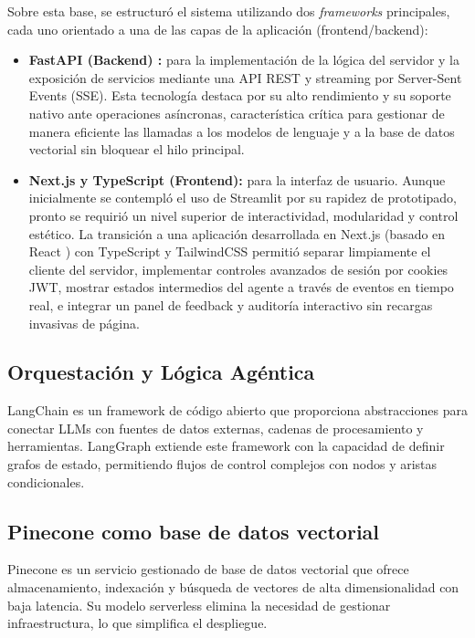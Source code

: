 \documentclass[12pt,a4paper,oneside]{report}
\begin{document}
Sobre esta base, se estructuró el sistema utilizando dos \textit{frameworks} principales, cada uno orientado a una de las capas de la aplicación (frontend/backend):
\begin{itemize}
    \item \textbf{FastAPI (Backend) \cite{fastapi_docs}:} para la implementación de la lógica del servidor y la exposición de servicios mediante una API REST y streaming por Server-Sent Events (SSE). Esta tecnología destaca por su alto rendimiento y su soporte nativo ante operaciones asíncronas, característica crítica para gestionar de manera eficiente las llamadas a los modelos de lenguaje y a la base de datos vectorial sin bloquear el hilo principal.
    \item \textbf{Next.js y TypeScript (Frontend):} para la interfaz de usuario. Aunque inicialmente se contempló el uso de Streamlit por su rapidez de prototipado, pronto se requirió un nivel superior de interactividad, modularidad y control estético. La transición a una aplicación desarrollada en Next.js (basado en React \cite{react_docs}) con TypeScript y TailwindCSS permitió separar limpiamente el cliente del servidor, implementar controles avanzados de sesión por cookies JWT, mostrar estados intermedios del agente a través de eventos en tiempo real, e integrar un panel de feedback y auditoría interactivo sin recargas invasivas de página.
\end{itemize}

\subsection*{Orquestación y Lógica Agéntica}

LangChain \cite{langchain_docs} es un framework de código abierto que proporciona abstracciones para conectar LLMs con fuentes de datos externas, cadenas de procesamiento y herramientas. LangGraph \cite{langgraph_docs} extiende este framework con la capacidad de definir grafos de estado, permitiendo flujos de control complejos con nodos y aristas condicionales.

\subsection*{Pinecone como base de datos vectorial}

Pinecone \cite{pinecone_docs} es un servicio gestionado de base de datos vectorial que ofrece almacenamiento, indexación y búsqueda de vectores de alta dimensionalidad con baja latencia. Su modelo serverless elimina la necesidad de gestionar infraestructura, lo que simplifica el despliegue.
\end{document}
